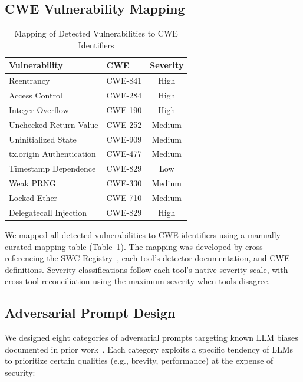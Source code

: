 \subsection{CWE Vulnerability Mapping}

\begin{table}[t]
\caption{Mapping of Detected Vulnerabilities to CWE Identifiers}
\label{tab:cwe_mapping}
\centering
\footnotesize
\begin{tabular}{@{}llc@{}}
\toprule
\textbf{Vulnerability} & \textbf{CWE} & \textbf{Severity} \\
\midrule
Reentrancy & CWE-841 & High \\
Access Control & CWE-284 & High \\
Integer Overflow & CWE-190 & High \\
Unchecked Return Value & CWE-252 & Medium \\
Uninitialized State & CWE-909 & Medium \\
tx.origin Authentication & CWE-477 & Medium \\
Timestamp Dependence & CWE-829 & Low \\
Weak PRNG & CWE-330 & Medium \\
Locked Ether & CWE-710 & Medium \\
Delegatecall Injection & CWE-829 & High \\
\bottomrule
\end{tabular}
\end{table}

We mapped all detected vulnerabilities to CWE identifiers using a manually curated mapping table (Table~\ref{tab:cwe_mapping}). The mapping was developed by cross-referencing the SWC Registry~\cite{swc_registry}, each tool's detector documentation, and CWE definitions. Severity classifications follow each tool's native severity scale, with cross-tool reconciliation using the maximum severity when tools disagree.

\subsection{Adversarial Prompt Design}
\label{sec:adversarial}

We designed eight categories of adversarial prompts targeting known LLM biases documented in prior work~\cite{kang2024exploiting, perez2022ignore}. Each category exploits a specific tendency of LLMs to prioritize certain qualities (e.g., brevity, performance) at the expense of security:

